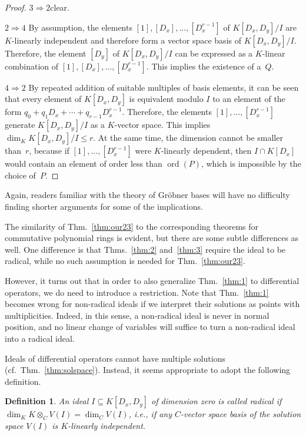\documentclass[a4paper,draft]{amsart}
\def\ord{\operatorname{ord}}
\newtheorem{defi}[thm]{Definition}
\begin{document}
\begin{proof}
  $3\Rightarrow 2$\quad clear.

  $2\Rightarrow 4$\quad
  By assumption, the elements $[1],[D_x],\dots,[D_x^{r-1}]$ of $K[D_x,D_y]/I$ are $K$-linearly
  independent and therefore form a vector space basis of $K[D_x,D_y]/I$.
  Therefore, the element $[D_y]$ of $K[D_x,D_y]/I$ can be expressed as a
  $K$-linear combination of $[1],[D_x],\dots,[D_x^{r-1}]$. This implies
  the existence of a~$Q$.

  $4\Rightarrow 2$\quad 
  By repeated addition of suitable multiples of basis elements, it can be seen
  that every element of $K[D_x,D_y]$ is equivalent modulo $I$ to an element
  of the form $q_0+q_1D_x+\cdots+q_{r-1}D_x^{r-1}$. Therefore, the elements $[1],\dots,[D_x^{r-1}]$
  generate $K[D_x,D_y]/I$ as a $K$-vector space. This implies
  $\dim_K K[D_x,D_y]/I\leq r$.
  At the same time, the dimension cannot be smaller than~$r$, because if
  $[1],\dots,[D_x^{r-1}]$ were $K$-linearly dependent, then $I\cap K[D_x]$ would
  contain an element of order less than $\ord(P)$, which is impossible by the choice of~$P$.
\end{proof}

Again, readers familiar with the theory of Gr\"obner bases will have no difficulty
finding shorter arguments for some of the implications. 

The similarity of Thm.~\ref{thm:our23} to the corresponding theorems for
commutative polynomial rings is evident, but there are some subtle differences
as well. One difference is that Thms.~\ref{thm:2} and~\ref{thm:3} require the ideal
to be radical, while no such assumption is needed for Thm.~\ref{thm:our23}.

However, it turns out that in order to also generalize Thm.~\ref{thm:1} to
differential operators, we do need to introduce a restriction. Note that
Thm.~\ref{thm:1} becomes wrong for non-radical ideals if we interpret their
solutions as points with multiplicities.  Indeed, in this sense, a non-radical
ideal is never in normal position, and no linear change of variables will
suffice to turn a non-radical ideal into a radical ideal.

Ideals of differential operators cannot have multiple solutions (cf.~Thm.~\ref{thm:solspace}).
Instead, it seems appropriate to adopt the following definition.

\begin{defi}\label{def:radical}
  An ideal $I\subseteq K[D_x,D_y]$ of dimension zero is called \emph{radical}
  if $\dim_K K\otimes_C V(I)=\dim_C V(I)$, i.e., if any $C$-vector space
  basis of the solution space $V(I)$ is $K$-linearly independent.
\end{defi}
\end{document}
